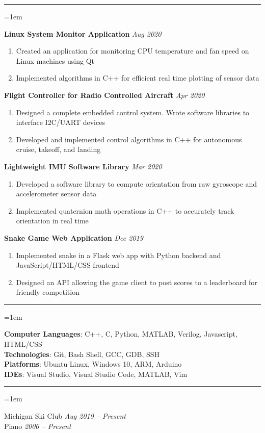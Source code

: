 \documentclass[12pt]{article}
\newcommand{\rheader}[1] { 
    \noindent{ 
        \large 
        \textbf{#1} 
        \par 
    }
    \vspace{-10pt}
    \noindent 
    \rule{7.5in}{0.5pt} 
}
\newcommand{\rdate}[1] {
    \hfill 
    \textit{#1}
}
\newcommand{\ritem} {
    \vspace{-10pt} 
    \item
}
\newenvironment{rsection} {
    \vspace{-5pt}
    \par 
    \medskip
    \leftskip=1em
    \noindent 
    \ignorespaces
} {
    \par 
    \medskip
    \vspace{5pt}
}
\newenvironment{rlist} {
    \begin{enumerate}[leftmargin=0.5in, label=$\bullet$]
} {
    \end{enumerate}
    \vspace{-10pt}
}
\begin{document}
\rheader{PROJECTS}
\begin{rsection}
    \textbf{Linux System Monitor Application} \rdate{Aug 2020}
    \begin{rlist}
        \ritem Created an application for monitoring CPU temperature and fan speed on Linux machines using Qt
        \ritem Implemented algorithms in C++ for efficient real time plotting of sensor data
    \end{rlist}
    \vspace{5pt}
    \textbf{Flight Controller for Radio Controlled Aircraft}  \rdate{Apr 2020}
    \begin{rlist}
        \ritem Designed a complete embedded control system. Wrote software libraries to interface I2C/UART devices
        \ritem Developed and implemented control algorithms in C++ for autonomous cruise, takeoff, and landing
    \end{rlist}
    \vspace{5pt}
    \textbf{Lightweight IMU Software Library} \rdate{Mar 2020}
    \begin{rlist}
        \ritem Developed a software library to compute orientation from raw gyroscope and accelerometer sensor data
        \ritem Implemented quaternion math operations in C++ to accurately track orientation in real time
    \end{rlist}
    \vspace{5pt}
    \textbf{Snake Game Web Application} \rdate{Dec 2019}
    \begin{rlist}
        \ritem Implemented snake in a Flask web app with Python backend and JavaScript/HTML/CSS frontend
        \ritem Designed an API allowing the game client to post scores to a leaderboard for friendly competition
    \end{rlist}
\end{rsection}


\rheader{SKILLS}
\begin{rsection}
    \textbf{Computer Languages}: C++, C, Python, MATLAB, Verilog, Javascript, HTML/CSS \\
    \textbf{Technologies}: Git, Bash Shell, GCC, GDB, SSH \\
    \textbf{Platforms}: Ubuntu Linux, Windows 10, ARM, Arduino \\
    \textbf{IDEs}: Visual Studio, Visual Studio Code, MATLAB, Vim
\end{rsection}


\rheader{ACTIVITIES}
\begin{rsection}
    Michigan Ski Club \rdate{Aug 2019 -- Present} \\
    Piano \rdate{2006 -- Present}
\end{rsection}
\end{document}
